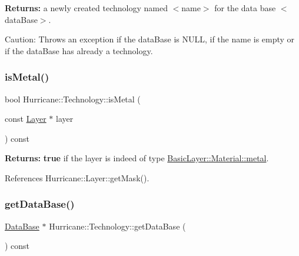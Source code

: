 {\bfseries Returns\+:} a newly created technology named {\ttfamily $<$name$>$} for the data base {\ttfamily $<$data\+Base$>$}.

\begin{DoxyParagraph}{Caution\+:}
Throws an exception if the {\ttfamily data\+Base} is {\ttfamily N\+U\+LL}, if the name is empty or if the {\ttfamily data\+Base} has already a technology. 
\end{DoxyParagraph}
\mbox{\label{classHurricane_1_1Technology_ae5590e455d35f76531a6feb0c0f111a2}} 
\subsubsection{\texorpdfstring{is\+Metal()}{isMetal()}}
{\footnotesize\ttfamily bool Hurricane\+::\+Technology\+::is\+Metal (\begin{DoxyParamCaption}\item[{const \hyperlink{classHurricane_1_1Layer}{Layer} $\ast$}]{layer }\end{DoxyParamCaption}) const\hspace{0.3cm}{\ttfamily [inline]}}

{\bfseries Returns\+:} {\bfseries true} if the {\ttfamily layer} is indeed of type \hyperlink{classHurricane_1_1BasicLayer_1_1Material_a3e815440ad4b86b3569fa54ca06fc3e8a9f5ac52339b7bd9bbf7cdac468c51924}{Basic\+Layer\+::\+Material\+::metal}. 

References Hurricane\+::\+Layer\+::get\+Mask().

\mbox{\label{classHurricane_1_1Technology_acf836e738fba14fa493b0e08148cc3ee}} 
\subsubsection{\texorpdfstring{get\+Data\+Base()}{getDataBase()}}
{\footnotesize\ttfamily \hyperlink{classHurricane_1_1DataBase}{Data\+Base} $\ast$ Hurricane\+::\+Technology\+::get\+Data\+Base (\begin{DoxyParamCaption}{ }\end{DoxyParamCaption}) const\hspace{0.3cm}{\ttfamily [inline]}}

